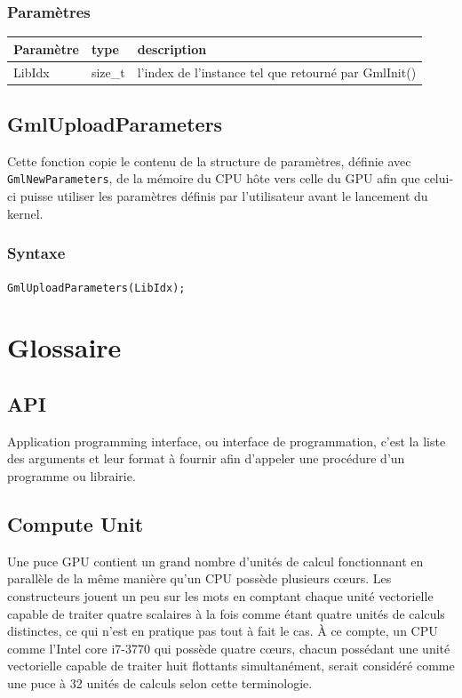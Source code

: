 \documentclass[a4paper,12pt]{article}
\begin{document}
\subsubsection*{Paramètres}

\begin{tabular}{|m{2cm}|m{1.5cm}|m{10.5cm}|}
\hline
Paramètre  & type    & description \\
\hline
LibIdx     & size\_t & l'index de l'instance tel que retourné par GmlInit() \\
\hline
\end{tabular}


\subsection{GmlUploadParameters}

Cette fonction copie le contenu de la structure de paramètres, définie avec {\tt GmlNewParameters}, de la mémoire du CPU hôte vers celle du GPU afin que celui-ci puisse utiliser les paramètres définis par l'utilisateur avant le lancement du kernel.

\subsubsection*{Syntaxe}
{\tt GmlUploadParameters(LibIdx);}


%
%


\section{Glossaire}

\subsection{API}
Application programming interface, ou interface de programmation, c'est la liste des arguments et leur format à fournir afin d'appeler une procédure d'un programme ou librairie.

\subsection{Compute Unit}
Une puce GPU contient un grand nombre d'unités de calcul fonctionnant en parallèle de la même manière qu'un CPU possède plusieurs c\oe urs. Les constructeurs jouent un peu sur les mots en comptant chaque unité vectorielle capable de traiter quatre scalaires à la fois comme étant quatre unités de calculs distinctes, ce qui n'est en pratique pas tout à fait le cas. À ce compte, un CPU comme l'Intel core i7-3770 qui possède quatre c\oe urs, chacun possédant une unité vectorielle capable de traiter huit flottants simultanément, serait considéré comme une puce à 32 unités de calculs selon cette terminologie.
\end{document}
